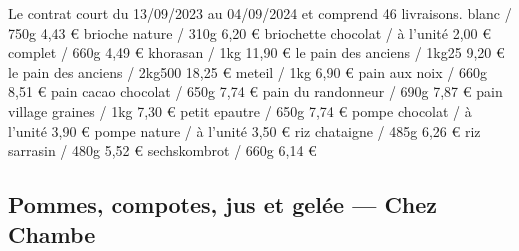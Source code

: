 \documentclass[10pt,a4paper,french]{article}
\makeatletter
\newcommand{\authoredby}[1]{\addtocontents{toc}{\protect\@nameuse{authoredby#1}}}%
\makeatother
\begin{document}
\noindent Le contrat court du 13/09/2023 au 04/09/2024 et comprend 46 livraisons.\newline\newline
{\color{Blue} blanc / 750g 4,43 € }\newline
{\color{Blue} brioche nature / 310g 6,20 € }\newline
{\color{Blue} briochette chocolat / à l'unité 2,00 € }\newline
{\color{Blue} complet / 660g 4,49 € }\newline
{\color{Blue} khorasan / 1kg 11,90 € }\newline
{\color{Blue} le pain des anciens / 1kg25 9,20 € }\newline
{\color{Blue} le pain des anciens / 2kg500 18,25 €}\newline
{\color{Blue} meteil / 1kg 6,90 € }\newline
{\color{Blue} pain aux noix / 660g 8,51 €}\newline
{\color{Blue} pain cacao chocolat / 650g 7,74 €}\newline
{\color{Blue} pain du randonneur / 690g 7,87 €}\newline
{\color{Blue} pain village graines / 1kg 7,30 € }\newline
{\color{Blue} petit epautre / 650g 7,74 €}\newline
{\color{Blue} pompe chocolat / à l'unité 3,90 € }\newline
{\color{Blue} pompe nature / à l'unité 3,50 €}\newline
{\color{Blue} riz chataigne / 485g 6,26 € }\newline
{\color{Blue} riz sarrasin / 480g 5,52 € }\newline
{\color{Blue} sechskombrot / 660g 6,14 €}

\authoredby{B}
\subsection{Pommes, compotes, jus et gelée --- Chez Chambe}
\end{document}
